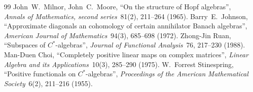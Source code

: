 \documentclass[12pt]{article}
\newtheorem[definition]{Definition}[Theorem]{Definition}
\newtheorem[remark]{Example}[Theorem]{Example}
\newtheorem[remark]{Remark}[Theorem]{Remark}
\newtheorem[remark]{Question}[Theorem]{Open question}
\newtheorem*[definition]{definition}{Definition}
\newtheorem*[remark]{example}{Example}
\newtheorem*[remark]{remark}{Remark}
\newtheorem*[remark]{question}{Open question}
\numberwithin{equation}{section}
\begin{document}
\begin{thebibliography}{99}
 John~W.\ Milnor, John~C.\ Moore, ``On the structure of Hopf algebras'', \textit{Annals of Mathematics, second series}\ 81(2), 211--264 (1965). 
 Barry~E.\ Johnson, ``Approximate diagonals an cohomology of certain annihilator Banach algebras'', \textit{American Journal of Mathematics}\ 94(3), 685--698 (1972).
 Zhong-Jin Ruan, ``Subspaces of $C^*$-algebras'', \textit{Journal of Functional Analysis}\ 76, 217--230 (1988).
 Man-Duen Choi, ``Completely positive linear maps on complex matrices'', \textit{Linear Algebra and its Applications}\ 10(3), 285--290 (1975).
 W.~Forrest Stinespring, ``Positive functionals on $C^*$-algebras'', \textit{Proceedings of the American Mathematical Society}\ 6(2), 211--216 (1955).
\end{thebibliography}
\end{document}
